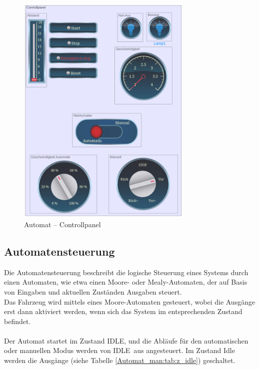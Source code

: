 \pagebreak[1]
\begin{figure}[!ht]
	\begin{center}
		\includegraphics[width=0.75\textwidth]{img/5_simulation/Automat_con.png}
		\caption{Automat – Controllpanel}
		\label{Controllpanel:img:Controllpanel}
	\end{center}
\end{figure}
\pagebreak[4]


\subsection{Automatensteuerung}
\label{Automatensteuerung}
Die Automatensteuerung beschreibt die logische Steuerung eines Systems durch einen Automaten, wie etwa einen Moore- oder Mealy-Automaten, der auf Basis von Eingaben und aktuellen Zuständen Ausgaben steuert.\\
Das Fahrzeug wird mittels eines Moore-Automaten gesteuert, wobei die Ausgänge erst dann aktiviert werden, wenn sich das System im entsprechenden Zustand befindet.\\ \ \\
Der Automat startet im Zustand \frqq IDLE\flqq, und die Abläufe für den automatischen oder manuellen Modus werden von \frqq IDLE\flqq\ aus angesteuert. Im Zustand Idle werden die Ausgänge (siehe Tabelle \ref{Automat_man:tab:z_idle}) geschaltet.\\


